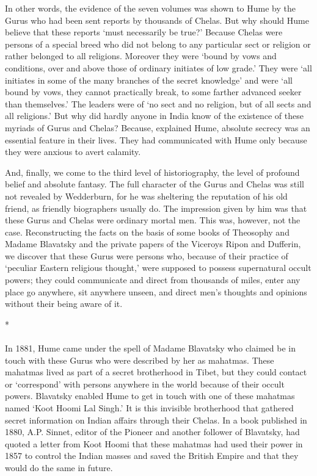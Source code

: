 In other words, the evidence of the seven volumes was shown to Hume by the Gurus who had been sent reports by thousands of Chelas. But why should Hume believe that these reports `must necessarily be true?' Because Chelas were persons of a special breed who did not belong to any particular sect or religion or rather belonged to all religions. Moreover they were `bound by vows and conditions, over and above those of ordinary initiates of low grade.' They were `all initiates in some of the many branches of the secret knowledge' and were `all bound by vows, they cannot practically break, to some farther advanced seeker than themselves.' The leaders were of `no sect and no religion, but of all sects and all religions.' But why did hardly anyone in India know of the existence of these myriads of Gurus and Chelas? Because, explained Hume, absolute secrecy was an essential feature in their lives. They had communicated with Hume only because they were anxious to avert calamity.

And, finally, we come to the third level of historiography, the level of profound belief and absolute fantasy. The full character of the Gurus and Chelas was still not revealed by Wedderburn, for he was sheltering the reputation of his old friend, as friendly biographers usually do. The impression given by him was that these Gurus and Chelas were ordinary mortal men. This was, however, not the case. Reconstructing the facts on the basis of some books of Theosophy and Madame Blavatsky and the private papers of the Viceroys Ripon and Dufferin, we discover that these Gurus were persons who, because of their practice of `peculiar Eastern religious thought,' were supposed to possess supernatural occult powers; they could communicate and direct from thousands of miles, enter any place go anywhere, sit anywhere unseen, and direct men's thoughts and opinions without their being aware of it.

\begin{center}*\end{center}

\paragraph*{}
In 1881, Hume came under the spell of Madame Blavatsky who claimed be in touch with these Gurus who were described by her as mahatmas. These mahatmas lived as part of a secret brotherhood in Tibet, but they could contact or `correspond' with persons anywhere in the world because of their occult powers. Blavatsky enabled Hume to get in touch with one of these mahatmas named `Koot Hoomi Lal Singh.' It is this invisible brotherhood that gathered secret information on Indian affairs through their Chelas. In a book published in 1880, A.P. Sinnet, editor of the Pioneer and another follower of Blavatsky, had quoted a letter from Koot Hoomi that these mahatmas had used their power in 1857 to control the Indian masses and saved the British Empire and that they would do the same in future.

